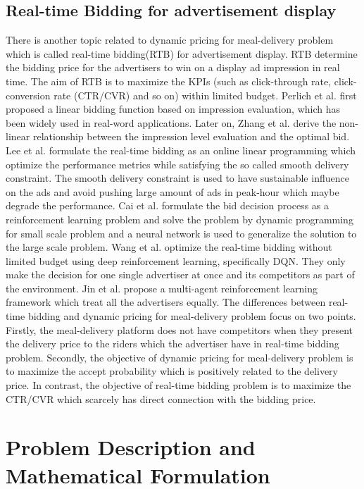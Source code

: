 \documentclass[sigconf,authordraft]{acmart}
\begin{document}
\subsection{Real-time Bidding for advertisement display}
There is another topic related to dynamic pricing for meal-delivery problem which is called real-time bidding(RTB) for advertisement display. RTB determine the bidding price for the advertisers to win on a display ad impression in real time. The aim of RTB is to maximize the KPIs (such as click-through rate, click-conversion rate (CTR/CVR) and so on) within limited budget. Perlich et al. \cite{perlich2012bid}first proposed a linear bidding function based on impression evaluation, which has been widely used in real-word applications. Later on, Zhang et al. \cite{zhang2014optimal} derive the non-linear relationship between the impression level evaluation and the optimal bid. Lee et al. \cite{lee2013real} formulate the real-time bidding as an online linear programming which optimize the performance metrics while satisfying the so called smooth delivery constraint. The smooth delivery constraint is used to have sustainable influence on the ads and avoid pushing large amount of ads in peak-hour which maybe degrade the performance. Cai et al. \cite{cai2017real} formulate the bid decision process as a reinforcement learning problem and solve the problem by dynamic programming for small scale problem and a neural network is used to generalize the solution to the large scale problem. Wang et al. \cite{wang2017ladder} optimize the real-time bidding without limited budget using deep reinforcement learning, specifically DQN. They only make the decision for one single advertiser at once and its competitors as part of the environment. Jin et al. \cite{jin2018real} propose a multi-agent reinforcement learning framework which treat all the advertisers equally. The differences between real-time bidding and dynamic pricing for meal-delivery problem focus on two points. Firstly, the meal-delivery platform does not have competitors when they present the delivery price to the riders which the advertiser have in real-time bidding problem. Secondly, the objective of dynamic pricing for meal-delivery problem is to maximize the accept probability which is positively related to the delivery price. In contrast, the objective of real-time bidding problem is to maximize the CTR/CVR which scarcely has direct connection with the bidding price.

\section{Problem Description and Mathematical Formulation}\label{sec:desc}
\end{document}
